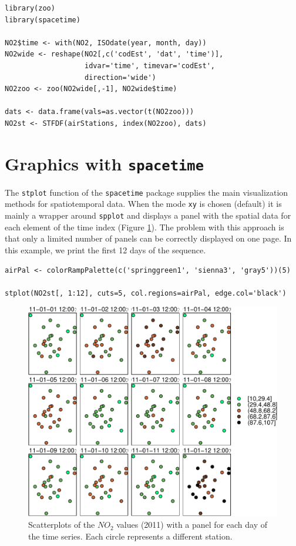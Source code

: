 \documentclass[smallroyalvopaper]{memoir}
\begin{document}

\lstset{language=R,numbers=none}
\begin{lstlisting}
library(zoo)
library(spacetime)

NO2$time <- with(NO2, ISOdate(year, month, day))
NO2wide <- reshape(NO2[,c('codEst', 'dat', 'time')],
                   idvar='time', timevar='codEst',
                   direction='wide')
NO2zoo <- zoo(NO2wide[,-1], NO2wide$time)

dats <- data.frame(vals=as.vector(t(NO2zoo)))
NO2st <- STFDF(airStations, index(NO2zoo), dats)
\end{lstlisting}
\section{Graphics with \texttt{spacetime}}
\label{sec-3}
The \texttt{stplot} function of the \texttt{spacetime} package supplies the main
visualization methods for spatiotemporal data. When the mode \texttt{xy} is
chosen (default) it is mainly a wrapper around \texttt{spplot} and displays a
panel with the spatial data for each element of the time index (Figure
\ref{fig:NO2STxy}). The problem with this approach is that only a limited
number of panels can be correctly displayed on one page. In this
example, we print the first 12 days of the sequence.


\lstset{language=R,numbers=none}
\begin{lstlisting}
airPal <- colorRampPalette(c('springgreen1', 'sienna3', 'gray5'))(5)

stplot(NO2st[, 1:12], cuts=5, col.regions=airPal, edge.col='black')
\end{lstlisting}

\begin{figure}[htb]
\centering
\includegraphics[width=.9\linewidth]{figs/NO2STxy.pdf}
\caption{\label{fig:NO2STxy}Scatterplots of the $NO_2$ values (2011) with a panel for each day of the time series. Each circle represents a different station.}
\end{figure}
\end{document}
